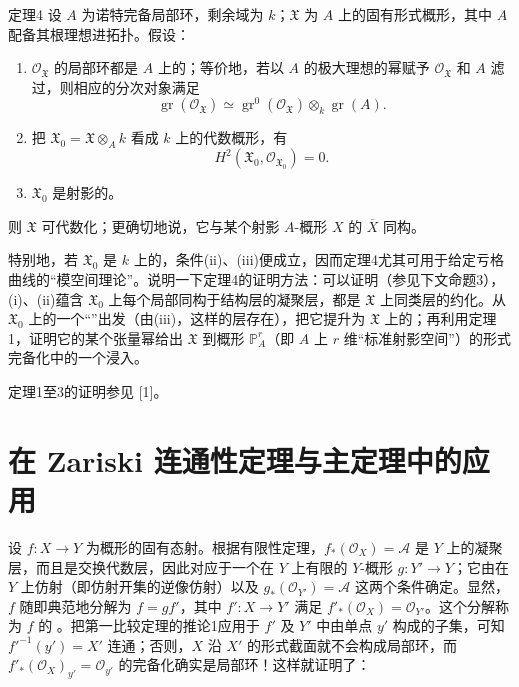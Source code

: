 \begin{statement}{定理4}
设 $A$ 为诺特完备局部环，剩余域为 $k$；$\mathfrak X$ 为 $A$ 上的固有形式概形，其中 $A$ 配备其根理想进拓扑。假设：
\begin{enumerate}
\item[(i)] $\mathcal O_{\mathfrak X}$ 的局部环都是 $A$ 上的；等价地，若以 $A$ 的极大理想的幂赋予 $\mathcal O_{\mathfrak X}$ 和 $A$ 滤过，则相应的分次对象满足
\[
\operatorname{gr}(\mathcal O_{\mathfrak X})\simeq
\operatorname{gr}^0(\mathcal O_{\mathfrak X})\otimes_k\operatorname{gr}(A).
\]
\item[(ii)] 把 $\mathfrak X_0=\mathfrak X\otimes_A k$ 看成 $k$ 上的代数概形，有
\[
H^2(\mathfrak X_0,\mathcal O_{\mathfrak X_0})=0.
\]
\item[(iii)] $\mathfrak X_0$ 是射影的。
\end{enumerate}
则 $\mathfrak X$ 可代数化；更确切地说，它与某个射影 $A$-概形 $X$ 的 $\overline X$ 同构。
\end{statement}
特别地，若 $\mathfrak X_0$ 是 $k$ 上的，条件(ii)、(iii)便成立，因而定理4尤其可用于给定亏格曲线的“模空间理论”。说明一下定理4的证明方法：可以证明（参见下文命题3），(i)、(ii)蕴含 $\mathfrak X_0$ 上每个局部同构于结构层的凝聚层，都是 $\mathfrak X$ 上同类层的约化。从 $\mathfrak X_0$ 上的一个“”出发（由(iii)，这样的层存在），把它提升为 $\mathfrak X$ 上的；再利用定理1，证明它的某个张量幂给出 $\mathfrak X$ 到概形 $\mathbb P_A^r$（即 $A$ 上 $r$ 维“标准射影空间”）的形式完备化中的一个浸入。

定理1至3的证明参见 [1]。

\section{在 Zariski 连通性定理与主定理中的应用}
设 $f:X\to Y$ 为概形的固有态射。根据有限性定理，$f_*(\mathcal O_X)=\mathcal A$ 是 $Y$ 上的凝聚层，而且是交换代数层，因此对应于一个在 $Y$ 上有限的 $Y$-概形 $g:Y'\to Y$；它由在 $Y$ 上仿射（即仿射开集的逆像仿射）以及 $g_*(\mathcal O_{Y'})=\mathcal A$ 这两个条件确定。显然，$f$ 随即典范地分解为 $f=gf'$，其中 $f':X\to Y'$ 满足 $f'_*(\mathcal O_X)=\mathcal O_{Y'}$。这个分解称为 $f$ 的 。把第一比较定理的推论1应用于 $f'$ 及 $Y'$ 中由单点 $y'$ 构成的子集，可知 $f'^{-1}(y')=X'$ 连通；否则，$X$ 沿 $X'$ 的形式截面就不会构成局部环，而 $f'_*(\mathcal O_X)_{y'}=\mathcal O_{y'}$ 的完备化确实是局部环！这样就证明了：

